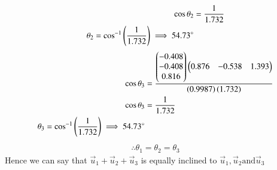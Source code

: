 \begin{enumerate}[label=\thesection.\arabic*,ref=\thesection.\theenumi]
\begin{align}
    \cos{\theta_2}&=\frac{1}{1.732}\\
    \theta_2=\cos^{-1}\left(\frac{1}{1.732}\right)
    \implies 54.73\degree
\end{align}
\begin{align}
     \cos{\theta_3}&=\frac{\begin{pmatrix}-0.408 \\-0.408\\0.816\end{pmatrix}\begin{pmatrix}0.876&-0.538&1.393\end{pmatrix}}{\left(0.9987\right)\left(1.732\right)}\\
    \cos{\theta_3}&=\frac{1}{1.732}\\
    \theta_3=\cos^{-1}\left(\frac{1}{1.732}\right)
    \implies 54.73\degree
\end{align}
\begin{align*}
    \therefore  \theta_1=\theta_2=\theta_3
\end{align*}
Hence  we can say that $\vec{u}_1+\vec{u}_2+\vec{u}_3 $ is equally inclined to $\vec{u}_1,\vec{u}_2 \text{and} \vec{u}_3  $ 
\end{enumerate}
